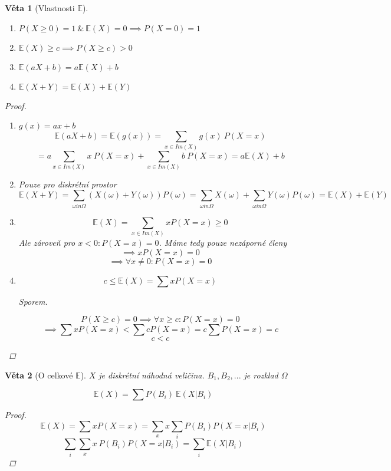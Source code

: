 \documentclass[10pt,a4paper]{article}
\theoremstyle{plain}
\newtheorem{veta}{Věta}
\theoremstyle{definition}
\begin{document}
\begin{veta}[Vlastnosti $\mathbb{E}$]
\begin{enumerate} \ 
\item $P(X \geq 0) = 1\ \&\ \mathbb{E}(X) = 0 \implies P(X = 0) = 1$
\item $\mathbb{E}(X) \geq c \implies P(X \geq c) > 0$
\item $\mathbb{E}(aX + b) = a\mathbb{E}(X)+b$
\item $\mathbb{E}(X + Y) = \mathbb{E}(X) + \mathbb{E}(Y)$
\end{enumerate}
\begin{proof}
\begin{enumerate}  
\item[3.] 
$g(x) = ax + b$
\[ \mathbb{E}(aX + b) =\mathbb{E}(g(x)) = \sum_{x \in Im(X)} g(x)\ P(X=x) \]
\[ = a \sum_{x \in Im(X)} x\ P(X=x) + \sum_{x \in Im(X)} b\ P(X=x) = a\mathbb{E}(X)+ b   \]
\item[4.] Pouze pro diskrétní prostor
\[\mathbb{E}(X + Y) = \sum_{\omega in \Omega} (X(\omega) + Y(\omega)) P(\omega) =
\sum_{\omega in \Omega} X(\omega) +  \sum_{\omega in \Omega} Y(\omega) P(\omega) = \mathbb{E}(X) + \mathbb{E}(Y)\]
\item[1.] 
\[ \mathbb{E}(X) = \sum_{x \in Im(X)} x P(X=x) \geq 0\]
Ale zároveň pro $x < 0: P(X = x) = 0$. Máme tedy pouze nezáporné členy
\[ \implies x P(X = x) = 0 \]
\[ \implies \forall x \neq 0: P(X = x) = 0 \]
\item[2.]
\[c \leq \mathbb{E}(X) = \sum x P(X = x)\]

Sporem.

\[P(X \geq c) = 0 \implies \forall x \geq c: P(X = x) = 0\]
\[ \implies \sum x P(X = x) <  \sum c P(X=x) = c \sum P(X = x) = c \]
\[ c < c\]
\end{enumerate}

\end{proof}
\end{veta}


\begin{veta}[O celkové $\mathbb{E}$]

$X$ je diskrétní náhodná veličina. $B_1, B_2, ...$ je rozklad $\Omega$

\[ \mathbb{E}(X) = \sum P(B_i) \ \mathbb{E}(X|B_i)\]
\begin{proof}
\[\mathbb{E}(X) = \sum x P(X=x) = \sum_x x \sum_i P(B_i) P(X=x|B_i)  \]
\[\sum_i \sum_x x\ P(B_i) P(X=x|B_i) = \sum_i \mathbb{E}(X|B_i) \]
\end{proof}
\end{veta}
\end{document}
